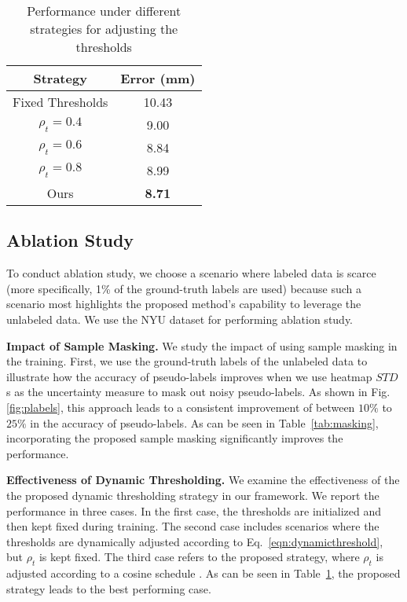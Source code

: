 \documentclass{article}
\begin{document}
\begin{table}[t]
\caption{Performance under different strategies for adjusting the thresholds}
\centering
\setlength{\tabcolsep}{4pt}
\begin{tabular}{cc}
\hline
                    Strategy                    &   Error (mm)  \\
\hline
        {Fixed Thresholds}               & 10.43 \\
        {$\rho_t = 0.4$}                   & 9.00 \\
      {$\rho_t = 0.6$}                    & 8.84 \\
        {$\rho_t = 0.8$}                   & 8.99 \\

        {Ours}                       &   \textbf{ 8.71} \\

\hline
\end{tabular}
\label{tab:dynamic}
\end{table}

\subsection{Ablation Study}
To conduct ablation study, we choose a scenario where labeled data is scarce (more specifically, 1\% of the ground-truth labels are used) because such a scenario most highlights the proposed method's capability to leverage the unlabeled data. We use the NYU dataset for performing ablation study.
\par
\textbf{Impact of Sample Masking.} We study the impact of using sample masking in the training. First, we use the ground-truth labels of the unlabeled data to illustrate how the accuracy of pseudo-labels improves when we use heatmap $STD$s as the uncertainty measure to mask out noisy pseudo-labels. As shown in Fig. \ref{fig:plabels},  this approach leads to a consistent improvement of between $10\%$ to $25\%$ in the accuracy of pseudo-labels. As can be seen in Table~\ref{tab:masking}, incorporating the proposed sample masking significantly improves the performance.
\par
\textbf{Effectiveness of Dynamic Thresholding.} We examine the effectiveness of the the proposed dynamic thresholding strategy in our framework. We report the performance in three cases. In the first case, the thresholds are initialized and then kept fixed during training. The second case includes scenarios where the thresholds are dynamically adjusted according to Eq.~\ref{eqn:dynamicthreshold}, but $\rho_t$ is kept fixed. The third case refers to the proposed strategy, where $\rho_t$ is adjusted according to a cosine schedule \cite{loshchilov2016sgdr}. As can be seen in Table~\ref{tab:dynamic}, the proposed strategy leads to the best performing case.
\par
\end{document}
